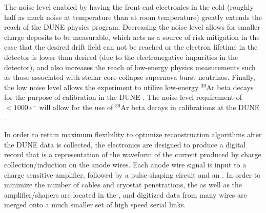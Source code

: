 
The noise level enabled by having the front-end electronics in the cold (roughly half as much noise at \lar temperature than at room temperature) greatly extends the reach of the DUNE physics program.  Decreasing the noise level allows for smaller charge deposits to be measurable, which acts as a source of risk mitigation in the case that the desired drift field can not be reached or the electron lifetime in the detector is lower than desired (due to the electronegative impurities in the detector), and also increases the reach of low-energy physics measurements such as those associated with stellar core-collapse supernova burst neutrinos.  Finally, the low noise level allows the experiment to utilize low-energy $\mathrm{{}^{39}Ar}$ beta decays for the purpose of calibration in the DUNE .  The noise level requirement of \,$<\num{1000}\,e^-$ will allow for the use of $\mathrm{{}^{39}Ar}$ beta decays in calibrations at the DUNE .

In order to retain maximum flexibility to optimize reconstruction algorithms after the DUNE data is collected, the  electronics are designed to produce a digital record that is a representation of the waveform of the current produced by charge collection/induction on the anode wires.  Each anode wire signal is input to a charge sensitive amplifier, followed by a pulse shaping circuit and an .  In order to minimize the number of cables and cryostat penetrations, the  as well as the amplifier/shapers are located in the \lar, and digitized data from many wires are merged onto a much smaller set of high speed serial links.  %

